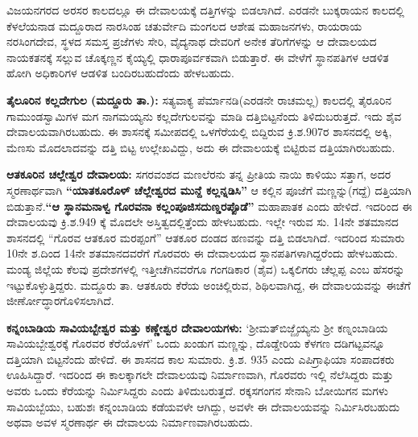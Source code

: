 ವಿಜಯನಗರದ ಅರಸರ ಕಾಲದಲ್ಲೂ ಈ ದೇವಾಲಯಕ್ಕೆ ದತ್ತಿಗಳನ್ನು ಬಿಡಲಾಗಿದೆ. ಎರಡನೇ ಬುಕ್ಕರಾಯನ ಕಾಲದಲ್ಲಿ ಕೆಳಲೆಯನಾಡ ಮದ್ದೂರಾದ ನಾರಸಿಂಹ ಚತುರ್ವೇದಿ ಮಂಗಲದ ಆಶೇಷ ಮಹಾಜನಗಳು, ರಾಯರಾಯ ನರಸಿಂಗದೇವ, ಸ್ಥಳದ ಸಮಸ್ತ ಪ್ರಜೆಗಳು ಸೇರಿ, ವೈದ್ಯನಾಥ ದೇವರಿಗೆ ಅನೇಕ ತೆರಿಗೆಗಳನ್ನು ಆ ದೇವಾಲಯದ ನಾಯಕತನಕ್ಕೆ ಸಲ್ಲುವ ಚೊಕ್ಕಣ್ಣನ ಕೈಯ್ಯಲ್ಲಿ ಧಾರಾಪೂರ್ವಕವಾಗಿ ಬಿಡುತ್ತಾರೆ. ಈ ವೇಳೆಗೆ ಸ್ಥಾನಪತಿಗಳ ಆಡಳಿತ ಹೋಗಿ ಅಧಿಕಾರಿಗಳ ಆಡಳಿತ ಬಂದಿರಬಹುದೆಂದು ಹೇಳಬಹುದು.

\textbf{ತೈಲೂರಿನ ಕಲ್ಲದೇಗುಲ (ಮದ್ದೂರು ತಾ.):} ಸತ್ಯವಾಕ್ಯ ಪೆರ್ಮಾನಡಿ(ಎರಡನೇ ರಾಚಮಲ್ಲ) ಕಾಲದಲ್ಲಿ ತೈರೂರಿನ ಗಾಮುಂಡಸ್ವಾಮಿ\-ಗಳ ಮಗ ನಾಗಮಯ್ಯನು ಕಲ್ಲದೇಗುಲವನ್ನು ಮಾಡಿ ದತ್ತಿಬಿಟ್ಟನೆಂದು ತಿಳಿದುಬರುತ್ತದೆ. ಇದು ಶೈವ ದೇವಾಲಯವಾಗಿರ\-ಬಹುದು. ಈ ಶಾಸನಕ್ಕೆ ಸಮೀಪದಲ್ಲಿ ಒಳಗೆರೆಯಲ್ಲಿ ಬಿದ್ದಿರುವ ಕ್ರಿ.ಶ.907ರ ಶಾಸನದಲ್ಲಿ ಅಕ್ಕಿ, ಮೆಣಸು ಮೊದಲಾದವನ್ನು ದತ್ತಿ ಬಿಟ್ಟ ಉಲ್ಲೇಖವಿದ್ದು, ಅದು ಈ ದೇವಾಲಯಕ್ಕೆ ಬಿಟ್ಟಿರುವ ದತ್ತಿಯಾಗಿರಬಹುದು.

\textbf{ಆತಕೂರಿನ ಚಲ್ಲೇಶ್ವರ ದೇವಾಲಯ:} ಸಗರವಂಶದ ಮಣಲೆರನು ತನ್ನ ಪ್ರೀತಿಯ ನಾಯಿ ಕಾಳಿಯು ಸತ್ತಾಗ, ಅದರ ಸ್ಮರಣಾರ್ಥವಾಗಿ \textbf{“ಯಾತಕೂರೊಳ್​ ಚೆಲ್ಲೇಶ್ವರದ ಮುನ್ದೆ ಕಲ್ಲನ್ನಡಿಸಿ”} ಆ ಕಲ್ಲಿನ ಪೂಜೆಗೆ ಮಣ್ಣನ್ನು(ಗದ್ದೆ) ದತ್ತಿಯಾಗಿ ಬಿಡುತ್ತಾನೆ.\textbf{“ಆ ಸ್ಥಾನಮನಾಳ್ವ ಗೊರವನಾ ಕಲ್ಲಂಪೂಜಿಸದುಣ್ಡರಪ್ಪೊಡೆ”} ಮಹಾಪಾತಕ ಎಂದು ಹೇಳಿದೆ. ಇದರಿಂದ ಈ ದೇವಾಲಯವು ಕ್ರಿ.ಶ.949 ಕ್ಕೆ ಮೊದಲೇ ಅಸ್ತಿತ್ವದಲ್ಲಿತ್ತೆಂದು ಹೇಳಬಹುದು. ಇಲ್ಲೇ ಇರುವ ಸು. 14ನೇ ಶತಮಾನದ ಶಾಸನದಲ್ಲಿ “ಗೊರವ ಆತಕೂರ ಮರಪ್ಪಂಗೆ” ಆತಕೂರ ದಂಡದ ಹಣವನ್ನು ದತ್ತಿ ಬಿಡಲಾಗಿದೆ. ಇದರಿಂದ ಸುಮಾರು 10ನೇ ಶ.ದಿಂದ 14ನೇ ಶತಮಾನದವರೆಗೆ ಗೊರವರು ಈ ದೇವಾಲಯದ ಸ್ಥಾನಪತಿಗಳಾಗಿದ್ದರೆಂದು ಹೇಳಬಹುದು. ಮಂಡ್ಯ ಜಿಲ್ಲೆಯ ಕೆಲವು ಪ್ರದೇಶಗಳಲ್ಲಿ ಇತ್ತೀಚೆಗಿನವರೆಗೂ ಗಂಗಡಿಕಾರ (ಶೈವ) ಒಕ್ಕಲಿಗರು ಚೆಲ್ಲಪ್ಪ ಎಂಬ ಹೆಸರನ್ನು ಇಟ್ಟುಕೊಳ್ಳುತ್ತಿದ್ದರು. ಮದ್ದೂರು ತಾ. ಆತಕೂರು ಕೆರೆಯ ಅಂಚಿಲ್ಲಿರುವ, ಶಿಥಿಲವಾಗಿದ್ದ, ಈ ದೇವಾಲಯವನ್ನು ಈಚೆಗೆ ಜೀರ್ಣೋದ್ಧಾರಗೊಳಿಸಲಾಗಿದೆ.

\textbf{ಕನ್ನಂಬಾಡಿಯ ಸಾವಿಯಬ್ಬೇಶ್ವರ ಮತ್ತು ಕಣ್ಣೇಶ್ವರ ದೇವಾಲಯಗಳು:} ‘ಶ‍್ರೀಮತ್​ ಬಿಜ್ಜೈಯ್ಯನು ಶ‍್ರೀ ಕಣ್ನಂಬಾಡಿಯ ಸಾವಿಯಬ್ಬೇಶ್ವರಕ್ಕೆ ಗೊರವರ ಕೆರೆಯೊಳಗೆ’ ಒಂದು ಖಂಡುಗ ಮಣ್ಣನ್ನು, ದೊಡ್ಡೇರಿಯ ಕೆಳಗಣ ದಡಿಗಟ್ಟವನ್ನೂ ದತ್ತಿಯಾಗಿ ಬಿಟ್ಟನೆಂದು ಹೇಳಿದೆ. ಈ ಶಾಸನದ ಕಾಲ ಸುಮಾರು. ಕ್ರಿ.ಶ. 935 ಎಂದು ಎಪಿಗ್ರಾಫಿಯಾ ಸಂಪಾದಕರು ಊಹಿಸಿದ್ದಾರೆ. ಇದರಿಂದ ಈ ಕಾಲಕ್ಕಾಗಲೇ ದೇವಾಲಯವು ನಿರ್ಮಾಣವಾಗಿ, ಗೊರವರು ಇಲ್ಲಿ ನೆಲೆಸಿದ್ದರು ಮತ್ತು ಅವರು ಒಂದು ಕೆರೆಯನ್ನು ನಿರ್ಮಿಸಿದ್ದರು ಎಂದು ತಿಳಿದುಬರುತ್ತದೆ. ರಕ್ಕಸಗಂಗನ ಸೇನಾನಿ ಬೋಯಿಗನ ಮಗಳು ಸಾವಿಯಬ್ಬೆಯು, ಬಹುಶಃ ಕನ್ನಂಬಾಡಿಯ ಕಡೆಯವಳೇ ಆಗಿದ್ದು, ಅವಳೇ ಈ ದೇವಾಲಯವನ್ನು ನಿರ್ಮಿಸಿರಬಹುದು ಅಥವಾ ಅವಳ ಸ್ಮರಣಾರ್ಥ ಈ ದೇವಾಲಯ ನಿರ್ಮಾಣವಾಗಿರಬಹುದು.


